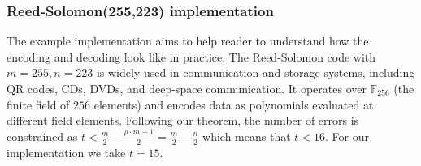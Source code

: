 \documentclass[../lecture-notes-148x210.tex]{subfiles}
\begin{document}
\subsubsection{Reed-Solomon(255,223) implementation}
The example implementation aims to help reader to understand how the encoding
and decoding look like in practice. The Reed-Solomon code with $m=255, n=223$
is widely used in communication and storage systems, including QR codes, CDs,
DVDs, and deep-space communication. It operates over $\mathbb{F}_{256}$ (the
finite field of $256$ elements) and encodes data as polynomials evaluated at
different field elements. Following our theorem, the number of errors 
is constrained as $t < \frac{m}{2} - \frac{\rho \cdot m + 1}{2} = \frac{m}{2} - \frac{n}{2}$ 
which means that $t < 16$. For our implementation we take $t = 15$.
\end{document}
